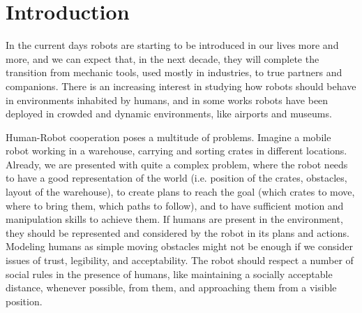 
\chapter{Introduction} %

\label{chapter-introduction} %



In the current days robots are starting to be introduced in our lives more and more, and we can expect that, in the next decade, they will complete the transition from mechanic tools, used mostly in industries, to true partners and companions. There is an increasing interest in studying how robots should behave in environments inhabited by humans, and in some works robots have been deployed in crowded and dynamic environments, like airports and museums.

Human-Robot cooperation poses a multitude of problems. Imagine a mobile robot working in a warehouse, carrying and sorting crates in different locations. Already, we are presented with quite a complex problem, where the robot needs to have a good representation of the world (i.e. position of the crates, obstacles, layout of the warehouse), to create plans to reach the goal (which crates to move, where to bring them, which paths to follow), and to have sufficient motion and manipulation skills to achieve them. If humans are present in the environment, they should be represented and considered by the robot in its plans and actions.  Modeling humans as simple moving obstacles might not be enough if we consider issues of trust, legibility, and acceptability. The robot should respect a number of social rules in the presence of humans, like maintaining a socially acceptable distance, whenever possible, from them, and approaching them from a visible position.

